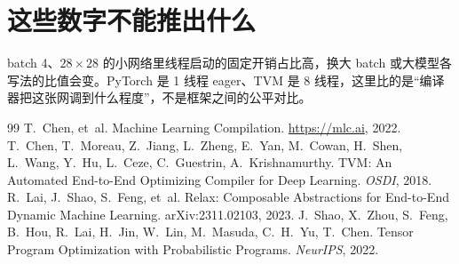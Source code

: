 \documentclass[11pt,a4paper]{ctexart}
\begin{document}
\section{这些数字不能推出什么}
batch 4、$28\times28$ 的小网络里线程启动的固定开销占比高，换大 batch 或大模型各写法的比值会变。PyTorch 是 1 线程 eager、TVM 是 8 线程，这里比的是“编译器把这张网调到什么程度”，不是框架之间的公平对比。

\begin{thebibliography}{99}
 T.~Chen, et~al. Machine Learning Compilation. \url{https://mlc.ai}, 2022.
 T.~Chen, T.~Moreau, Z.~Jiang, L.~Zheng, E.~Yan, M.~Cowan, H.~Shen, L.~Wang, Y.~Hu, L.~Ceze, C.~Guestrin, A.~Krishnamurthy. TVM: An Automated End-to-End Optimizing Compiler for Deep Learning. \emph{OSDI}, 2018.
 R.~Lai, J.~Shao, S.~Feng, et~al. Relax: Composable Abstractions for End-to-End Dynamic Machine Learning. arXiv:2311.02103, 2023.
 J.~Shao, X.~Zhou, S.~Feng, B.~Hou, R.~Lai, H.~Jin, W.~Lin, M.~Masuda, C.~H.~Yu, T.~Chen. Tensor Program Optimization with Probabilistic Programs. \emph{NeurIPS}, 2022.
\end{thebibliography}
\end{document}
